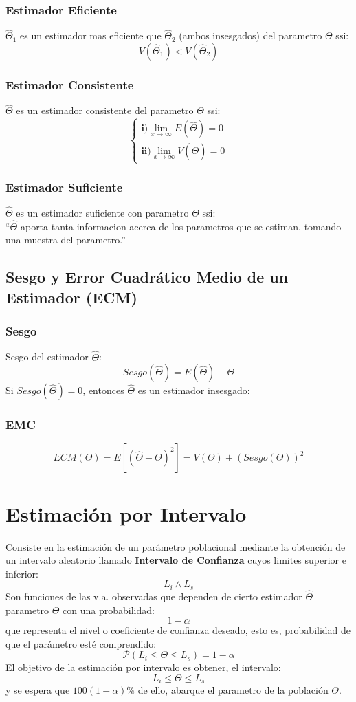 \subsubsection{Estimador Eficiente}
$\widehat{\Theta}_1$ es un estimador mas eficiente que $\widehat{\Theta}_2$ (ambos insesgados) del parametro $\Theta$ ssi:
$$ V(\widehat{\Theta}_1) < V(\widehat{\Theta}_2) $$
\subsubsection{Estimador Consistente}
$\widehat{\Theta}$ es un estimador consistente del parametro $\Theta$ ssi:
$$
\begin{cases}
\textbf{i)} \displaystyle\lim_{x\to\infty} E(\widehat{\Theta})=0 \\
\textbf{ii)} \displaystyle\lim_{x\to\infty} V(\widehat{\Theta})=0
\end{cases}
$$
\subsubsection{Estimador Suficiente}
$\widehat{\Theta}$ es un estimador suficiente con parametro  $\Theta$ ssi: \\${ }$\\

``$\widehat{\Theta}$ aporta tanta informacion acerca de los parametros que se estiman, tomando una muestra del parametro.''
\subsection{Sesgo y Error Cuadrático Medio de un Estimador (ECM)}
\subsubsection{Sesgo}
Sesgo del estimador $\widehat{\Theta}$:
$$Sesgo(\widehat{\Theta}) =  E(\widehat{\Theta}) - \Theta$$
Si $Sesgo(\widehat{\Theta})=0$, entonces $\widehat{\Theta}$ es un estimador insesgado:
\subsubsection{EMC}
$$ ECM(\Theta) = E[(\widehat{\Theta}-\Theta)^2] = V(\Theta) + (Sesgo(\Theta))^2$$
\section{Estimación por Intervalo}
Consiste en la estimación de un parámetro poblacional mediante la obtención de un intervalo aleatorio llamado \textbf{Intervalo de Confianza} cuyos limites superior e inferior:
$$ L_i \wedge L_s $$
Son funciones de las v.a. observadas que dependen de cierto estimador $\widehat{\Theta}$ parametro $\Theta$ con una probabilidad:
$$ 1-\alpha$$
que representa el nivel o coeficiente de confianza deseado, esto es, probabilidad de que el parámetro esté comprendido:
$$\mathcal{P}(L_i \leq \Theta \leq L_s) = 1-\alpha$$
El objetivo de la estimación por intervalo es obtener, el intervalo:
$$L_i \leq \Theta \leq L_s$$
y se espera que $100(1-\alpha)\%$ de ello, abarque  el parametro de la población $\Theta$.
